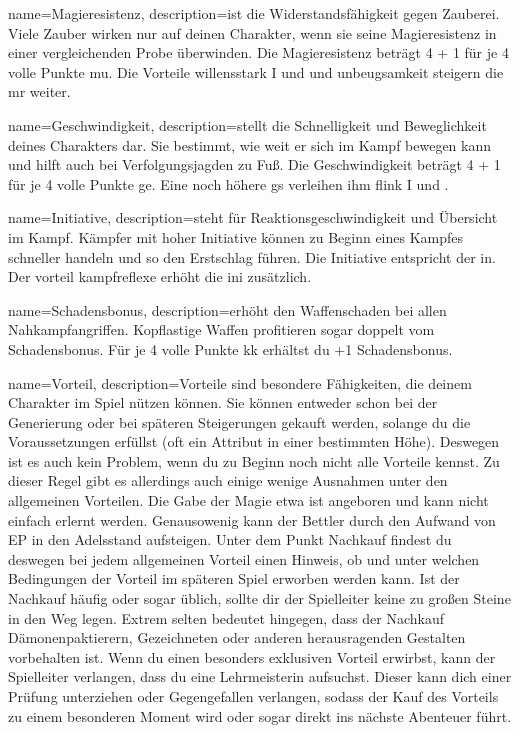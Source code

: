 {
    name={Magieresistenz},
    description={ist die Widerstandsfähigkeit gegen Zauberei. Viele Zauber wirken nur auf deinen Charakter, wenn sie seine Magieresistenz in einer vergleichenden Probe überwinden. Die Magieresistenz beträgt 4 + 1 für je 4 volle Punkte \gls{mu}. Die Vorteile \gls{willensstark I} und  und \gls{unbeugsamkeit} steigern die \gls{mr} weiter.}}

{
    name={Geschwindigkeit},
    description={stellt die Schnelligkeit und Beweglichkeit deines Charakters dar. Sie bestimmt, wie weit er sich im Kampf bewegen kann und hilft auch bei Verfolgungsjagden zu Fuß. Die Geschwindigkeit beträgt 4 + 1 für je 4 volle Punkte \gls{ge}. Eine noch höhere \gls{gs} verleihen ihm \gls{flink I} und .}}

{
    name={Initiative},
    description={steht für Reaktionsgeschwindigkeit und Übersicht im Kampf. Kämpfer mit hoher Initiative können zu Beginn eines Kampfes schneller handeln und so den Erstschlag führen. Die Initiative entspricht der \gls{in}. Der \gls{vorteil} \gls{kampfreflexe} erhöht die \gls{ini} zusätzlich.}}

{
    name={Schadensbonus},
    description={erhöht den Waffenschaden bei allen Nahkampfangriffen. Kopflastige Waffen profitieren sogar doppelt vom Schadensbonus. Für je 4 volle Punkte \gls{kk} erhältst du +1 Schadensbonus.}}

{
    name={Vorteil},
    description={Vorteile sind besondere Fähigkeiten, die deinem Charakter im Spiel nützen können. Sie können entweder schon bei der Generierung oder bei späteren Steigerungen gekauft werden, solange du die Voraussetzungen erfüllst (oft ein Attribut in einer bestimmten Höhe). Deswegen ist es auch kein Problem, wenn du zu Beginn noch nicht alle Vorteile kennst. Zu dieser Regel gibt es allerdings auch einige wenige Ausnahmen unter den allgemeinen Vorteilen. Die Gabe der Magie etwa ist angeboren und kann nicht einfach erlernt werden. Genausowenig kann der Bettler durch den Aufwand von EP in den Adelsstand aufsteigen. Unter dem Punkt Nachkauf findest du deswegen bei jedem allgemeinen Vorteil einen Hinweis, ob und unter welchen Bedingungen der Vorteil im späteren Spiel erworben werden kann. Ist der Nachkauf häufig oder sogar üblich, sollte dir der Spielleiter keine zu großen Steine in den Weg legen. Extrem selten bedeutet hingegen, dass der Nachkauf Dämonenpaktierern, Gezeichneten oder anderen herausragenden Gestalten vorbehalten ist. Wenn du einen besonders exklusiven Vorteil erwirbst, kann der Spielleiter verlangen, dass du eine Lehrmeisterin aufsuchst. Dieser kann dich einer Prüfung unterziehen oder Gegengefallen verlangen, sodass der Kauf des Vorteils zu einem besonderen Moment wird oder sogar direkt ins nächste Abenteuer führt.}}

